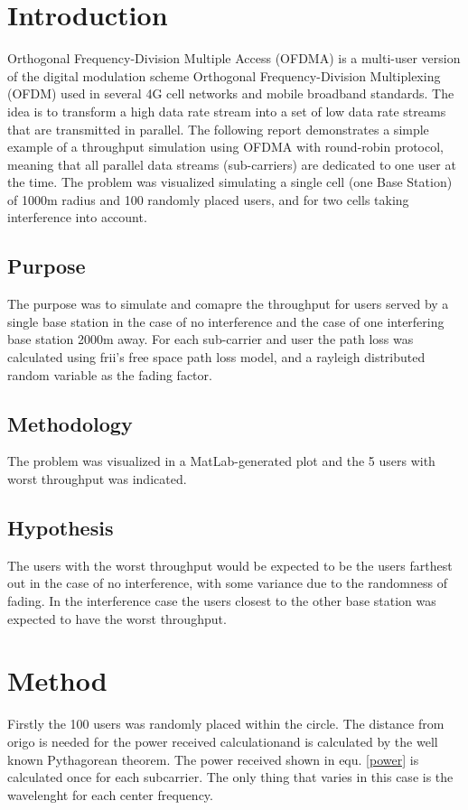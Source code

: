 \documentclass[twocolumn]{article}
\begin{document}
\section{Introduction}
Orthogonal Frequency-Division Multiple Access (OFDMA) is a multi-user version of the digital modulation scheme Orthogonal Frequency-Division Multiplexing (OFDM) used in several 4G cell networks and mobile broadband standards. The idea is to transform a high data rate stream into a set of low data rate streams that are transmitted in parallel. The following report demonstrates a simple example of a throughput simulation using OFDMA with round-robin protocol,%
 meaning that all parallel data streams (sub-carriers) are dedicated to one user at the time. The problem was visualized simulating a single cell (one Base Station) of 1000m radius and 100 randomly placed users, and for two cells taking interference into account.



\subsection{Purpose}
The purpose was to simulate and comapre the throughput for users served by a single base station in the case of no interference and the case of one interfering base station 2000m away. For each sub-carrier and user the path loss was calculated using frii's free space path loss model, and a rayleigh distributed random variable as the fading factor.


\subsection{Methodology}
The problem was visualized in a MatLab-generated plot and the 5 users with worst throughput was indicated.

\subsection{Hypothesis}
The users with the worst throughput would be expected to be the users farthest out in the case of no interference, with some variance due to the randomness of fading. In the interference case the users closest to the other base station was expected to have the worst throughput.
\section{Method}
Firstly the 100 users was randomly placed within the circle. The distance from origo is needed for the power received calculationand is calculated by the well known Pythagorean theorem. The power received shown in equ. \eqref{power}  is calculated once for each subcarrier. The only thing that varies in this case is the wavelenght for each center frequency.
\end{document}
